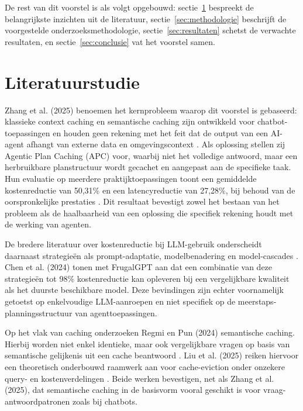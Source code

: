 \documentclass{hogent-article}
\begin{document}
De rest van dit voorstel is als volgt opgebouwd: sectie~\ref{sec:literatuurstudie} bespreekt de belangrijkste inzichten uit de literatuur, sectie~\ref{sec:methodologie} beschrijft de voorgestelde onderzoeksmethodologie, sectie~\ref{sec:resultaten} schetst de verwachte resultaten, en sectie~\ref{sec:conclusie} vat het voorstel samen.

\section{Literatuurstudie}%
\label{sec:literatuurstudie}

Zhang et al. (2025) benoemen het kernprobleem waarop dit voorstel is gebaseerd: klassieke context caching en semantische caching zijn ontwikkeld voor chatbot-toepassingen en houden geen rekening met het feit dat de output van een AI-agent afhangt van externe data en omgevingscontext \autocite{Zhang2025}. Als oplossing stellen zij Agentic Plan Caching (APC) voor, waarbij niet het volledige antwoord, maar een herbruikbare planstructuur wordt gecachet en aangepast aan de specifieke taak. Hun evaluatie op meerdere praktijktoepassingen toont een gemiddelde kostenreductie van 50,31\% en een latencyreductie van 27,28\%, bij behoud van de oorspronkelijke prestaties \autocite{Zhang2025}. Dit resultaat bevestigt zowel het bestaan van het probleem als de haalbaarheid van een oplossing die specifiek rekening houdt met de werking van agenten.

De bredere literatuur over kostenreductie bij LLM-gebruik onderscheidt daarnaast strategieën als prompt-adaptatie, modelbenadering en model-cascades \autocite{Chen2024}. Chen et al. (2024) tonen met FrugalGPT aan dat een combinatie van deze strategieën tot 98\% kostenreductie kan opleveren bij een vergelijkbare kwaliteit als het duurste beschikbare model. Deze bevindingen zijn echter voornamelijk getoetst op enkelvoudige LLM-aanroepen en niet specifiek op de meerstaps-planningsstructuur van agenttoepassingen.

Op het vlak van caching onderzoeken Regmi en Pun (2024) semantische caching. Hierbij worden niet enkel identieke, maar ook vergelijkbare vragen op basis van semantische gelijkenis uit een cache beantwoord \autocite{Regmi2024}. Liu et al. (2025) reiken hiervoor een theoretisch onderbouwd raamwerk aan voor cache-eviction onder onzekere query- en kostenverdelingen \autocite{Liu2025}. Beide werken bevestigen, net als Zhang et al. (2025), dat semantische caching in de basisvorm vooral geschikt is voor vraag-antwoordpatronen zoals bij chatbots.
\end{document}
